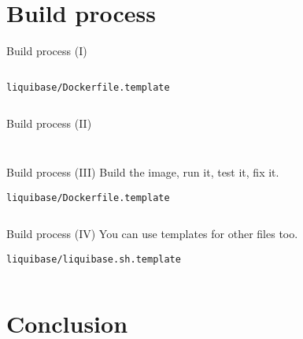 \documentclass{beamer}
\begin{document}
\section{Build process}

\begin{frame}{Build process (I)}
  \begin{block}{}
    \inputminted[fontsize=\small]{bash}{liquibase.mkdir.bash}
  \end{block}
  \pause

  \begin{exampleblock}{\texttt{liquibase/Dockerfile.template}}
    \inputminted[fontsize=\small]{bash}{dockerfile.boilerplate}
  \end{exampleblock}

\end{frame}

\begin{frame}{Build process (II)}
  \begin{block}{}
    \inputminted[fontsize=\small]{bash}{liquibase.build.bash}
  \end{block}
  \pause

  \begin{exampleblock}{}
    \inputminted[fontsize=\tiny]{bash}{liquibase.build.output}
  \end{exampleblock}
\end{frame}

\begin{frame}{Build process (III)}
  Build the image, run it, test it, fix it.
  \begin{block}{\texttt{liquibase/Dockerfile.template}}
    \inputminted[fontsize=\tiny]{bash}{liquibase.dockerfile}
  \end{block}
\end{frame}

\begin{frame}{Build process (IV)}
  You can use templates for other files too.
  \begin{exampleblock}{\texttt{liquibase/liquibase.sh.template}}
    \inputminted[fontsize=\small]{bash}{liquibase.sh}
  \end{exampleblock}

\end{frame}

\section{Conclusion}
\end{document}
